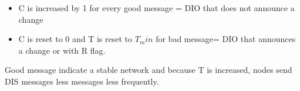 \begin{itemize}
    \item C is increased by 1 for every good message = DIO that does not announce a
        change
    \item C is reset to 0 and T is reset to $T_min$ for bad message= DIO that 
        announces a change or with R flag.
\end{itemize}
Good message indicate a stable network and because T is increased,
nodes send DIS messages less messages less frequently.


